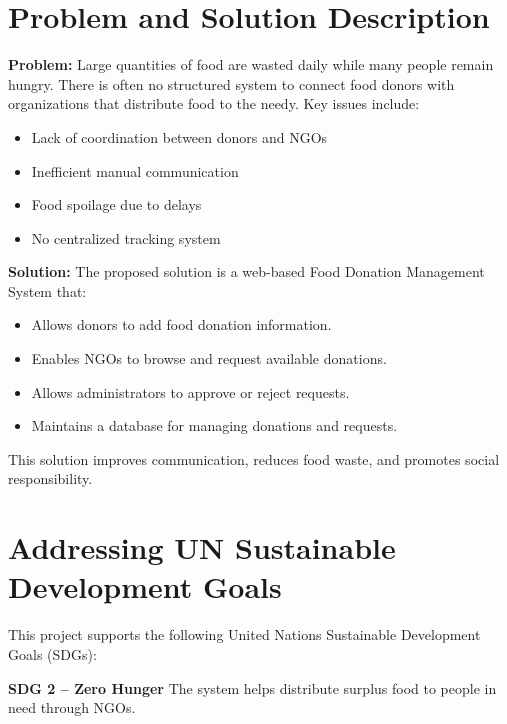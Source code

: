 \vspace{140pt}
\section{Problem and Solution Description}

\textbf{Problem:} Large quantities of food are wasted daily while many people remain hungry. There is often no structured system to connect food donors with organizations that distribute food to the needy.
Key issues include:
\begin{itemize}
\item Lack of coordination between donors and NGOs
\item Inefficient manual communication
\item Food spoilage due to delays
\item No centralized tracking system
\end{itemize}

\vspace{10pt}
\textbf{Solution:} The proposed solution is a web-based Food Donation Management System that:
\begin{itemize}
\item Allows donors to add food donation information.
\item Enables NGOs to browse and request available donations.
\item Allows administrators to approve or reject requests.
\item Maintains a database for managing donations and requests.

\end{itemize}
This solution improves communication, reduces food waste, and promotes social responsibility.






\vspace{30pt}
\section{Addressing UN Sustainable Development Goals}

This project supports the following United Nations Sustainable Development Goals (SDGs):

 \vspace{5pt}
\textbf{SDG 2 – Zero Hunger}
 The system helps distribute surplus food to people in need through NGOs.
 \vspace{10pt}
 
